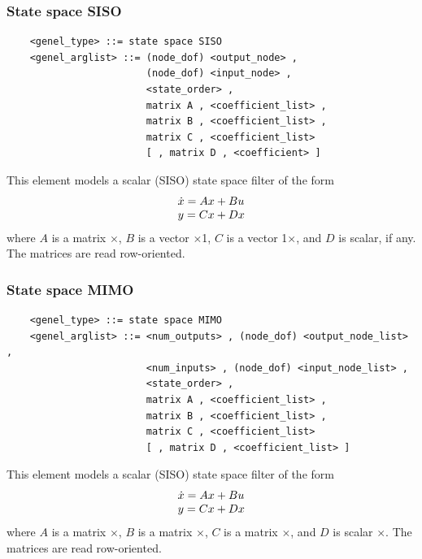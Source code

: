 \subsubsection{State space SISO}
\begin{verbatim}
    <genel_type> ::= state space SISO
    <genel_arglist> ::= (node_dof) <output_node> ,
                        (node_dof) <input_node> ,
                        <state_order> ,
                        matrix A , <coefficient_list> ,
                        matrix B , <coefficient_list> ,
                        matrix C , <coefficient_list>
                        [ , matrix D , <coefficient> ]
\end{verbatim}
This element models a scalar (SISO) state space filter of the form
\begin{displaymath}
    \begin{array}{l}  
        \dot{x} = Ax+Bu \\
	y = Cx+Dx
     \end{array}
\end{displaymath}
where $ A $ is a matrix $\times$,
$ B $ is a vector $\times$1,
$ C $ is a vector 1$\times$,
and $ D $ is scalar, if any.
The matrices are read row-oriented.

\subsubsection{State space MIMO}
\begin{verbatim}
    <genel_type> ::= state space MIMO
    <genel_arglist> ::= <num_outputs> , (node_dof) <output_node_list> ,
                        <num_inputs> , (node_dof) <input_node_list> ,
                        <state_order> ,
                        matrix A , <coefficient_list> ,
                        matrix B , <coefficient_list> ,
                        matrix C , <coefficient_list>
                        [ , matrix D , <coefficient_list> ]
\end{verbatim}
This element models a scalar (SISO) state space filter of the form
\begin{displaymath}
    \begin{array}{l}  
        \dot{x} = Ax+Bu \\
	y = Cx+Dx
     \end{array}
\end{displaymath}
where $ A $ is a matrix $\times$,
$ B $ is a matrix $\times$,
$ C $ is a matrix $\times$,
and $ D $ is scalar $\times$.
The matrices are read row-oriented.




